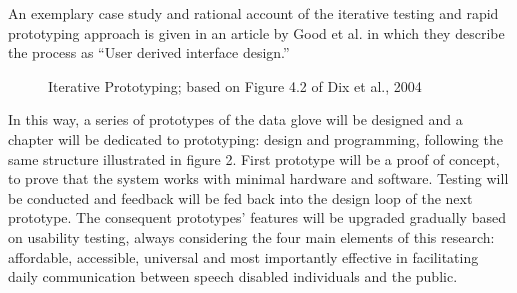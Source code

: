 An exemplary case study and rational account of the iterative testing and rapid prototyping approach is given in an article by Good et al. \parencite{Cox2008} in which they describe the process as ``User derived interface design.''

\begin{figure} 
    \centering
    \caption{Iterative Prototyping; based on Figure 4.2 of Dix et al., 2004}
    \label{fig:idpdiagram2}
\end{figure}

In this way, a series of prototypes of the data glove will be designed and a chapter will be dedicated to prototyping: design and programming, following the same structure illustrated in figure 2. First prototype will be a proof of concept, to prove that the system works with minimal hardware and software. Testing will be conducted and feedback will be fed back into the design loop of the next prototype. The consequent prototypes’ features will be upgraded gradually based on usability testing, always considering the four main elements of this research: affordable, accessible, universal and most importantly effective in facilitating daily communication between speech disabled individuals and the public. 


